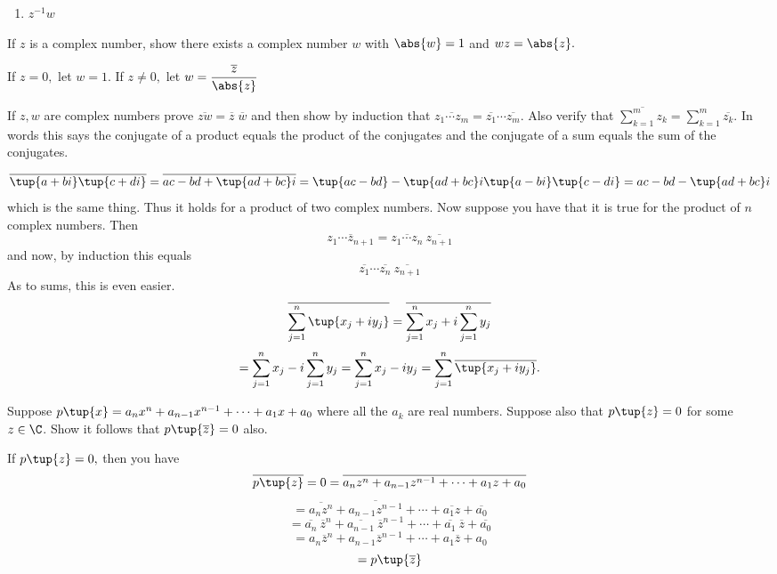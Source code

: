 \begin{enumialphparenastyle}
\begin{ex}
\begin{enumerate}
\item $z^{-1}w$

\end{enumerate}
\end{ex}

\begin{ex} If $z$ is a complex number, show there exists a complex
number $w$ with $\abs{w }=1$ and $wz=\abs{z}.$ 
\begin{sol}
If $z=0,$ let $w =1.$ If $z\neq 0,$ let $w =\displaystyle\frac{\overline{z}}{\abs{z}}$
\end{sol}
\end{ex}

\begin{ex} \label{exercomplex2}If $z,w$ are complex
 numbers prove $
\overline{zw}=\overline{z} \; \overline{w}$ and then show by induction that 
$\overline{z_{1}\cdots z_{m}}=\overline{z_{1}}\cdots \overline{z_{m}}$. Also
verify that $\overline{\sum_{k=1}^{m}z_{k}}=\sum_{k=1}^{m}\overline{z_{k}}$.
In words this says the conjugate of a product equals the product of the
conjugates and the conjugate of a sum equals the sum of the conjugates. 
\begin{sol}
\[
\overline{\tup{a+bi} \tup{c+di} }=\overline{ac-bd+\tup{
ad+bc}i }=\tup{ac-bd} -\tup{ad+bc}i \tup{
a-bi} \tup{c-di} =ac-bd-\tup{ad+bc}i 
\]
 which is the
same thing. Thus it holds for a product of two complex numbers. Now suppose
 you have that it is true for the product of $n$ complex numbers. Then
\[
\overline{z_{1}\cdots z_{n+1}}=\overline{z_{1}\cdots z_{n}}\ \overline{
z_{n+1}}
\]
and now, by induction this equals
\[
\overline{z_{1}}\cdots \overline{z_{n}}\ \overline{z_{n+1}}
\]
As to sums, this is even easier.
\[
\overline{\sum_{j=1}^{n}\tup{x_{j}+iy_{j}} }=\overline{%
\sum_{j=1}^{n}x_{j}+i\sum_{j=1}^{n}y_{j}}
\]
\[
=\sum_{j=1}^{n}x_{j}-i\sum_{j=1}^{n}y_{j}=\sum_{j=1}^{n}x_{j}-iy_{j}=
\sum_{j=1}^{n}\overline{\tup{x_{j}+iy_{j}} }.
\]
\end{sol}
\end{ex}

\begin{ex} \label{15julyprob2}Suppose $p\tup{x}
=a_{n}x^{n}+a_{n-1}x^{n-1}+\cdots +a_{1}x+a_{0}$ where all the $a_{k}$ are
real numbers. Suppose also that $p\tup{z} =0$ for some $z\in \C$. Show it follows that $p\tup{\overline{z}} =0$ also. 
\begin{sol}
If $p\tup{z} =0,$ then you have
\[
\overline{p\tup{z} }=0=\overline{a_{n}z^{n}+a_{n-1}z^{n-1}+\cdots
+a_{1}z+a_{0}}
\]
\[
=\overline{a_{n}z^{n}}+\overline{a_{n-1}z^{n-1}}+\cdots +\overline{a_{1}z}+
\overline{a_{0}}
\]
\[
=\overline{a_{n}}\ \overline{z}^{n}+\overline{a_{n-1}}\ \overline{z}
^{n-1}+\cdots +\overline{a_{1}}\ \overline{z}+\overline{a_{0}}
\]
\[
=a_{n}\overline{z}^{n}+a_{n-1}\overline{z}^{n-1}+\cdots +a_{1}\overline{z}
+a_{0}
\]
\[
=p\tup{\overline{z}}
\]
\end{sol}
\end{ex}


\end{enumialphparenastyle}
